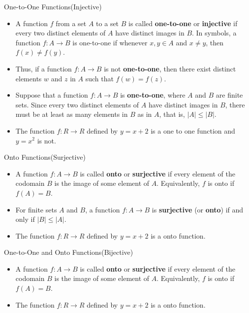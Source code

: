 \documentclass{beamer}
\begin{document}
\begin{frame}{One-to-One Functions(Injective)}
\begin{itemize}
    \item A function $f$ from a set $A$ to a set $B$ is called \textbf{one-to-one} or \textbf{injective} if every two distinct elements of $A$ have distinct images in $B$. In symbols, a function $f: A \to B$ is one-to-one if whenever $x, y \in A$ and $x \neq y$, then $f(x) \neq f(y)$.
    \item Thus, if a function $f: A \rightarrow B$ is not \textbf{one-to-one}, then there exist distinct elements $w$ and $z$ in $A$ such that $f(w) = f(z)$.
    \item Suppose that a function $f: A \rightarrow B$ is \textbf{one-to-one}, where $A$ and $B$ are finite sets. Since every two distinct elements of $A$ have distinct images in $B$, there must be at least as many elements in $B$ as in $A$, that is, $|A| \le |B|$.

    \item The function $f:R \to R$ defined by $y=x+2$ is a one to one function and $y=x^{2}$ is not.
\end{itemize}
\end{frame}

\begin{frame}{Onto Functions(Surjective)}
\begin{itemize}
    \item A function $f: A \rightarrow B$ is called \textbf{onto} or \textbf{surjective} if every element of the codomain $B$ is the image of some element of $A$. Equivalently, $f$ is onto if $f(A) = B$.
      \item For finite sets $A$ and $B$, a function $f: A \rightarrow B$ is \textbf{surjective} (or \textbf{onto}) if and only if $|B| \le |A|$.
    \item The function $f:R \to R$ defined by $y=x+2$ is a onto function.
    
\end{itemize}
\end{frame}

\begin{frame}{One-to-One and Onto Functions(Bijective)}
\begin{itemize}
    \item A function $f: A \rightarrow B$ is called \textbf{onto} or \textbf{surjective} if every element of the codomain $B$ is the image of some element of $A$. Equivalently, $f$ is onto if $f(A) = B$.
  
    \item The function $f:R \to R$ defined by $y=x+2$ is a onto function.
    
\end{itemize}
\end{frame}
\end{document}
